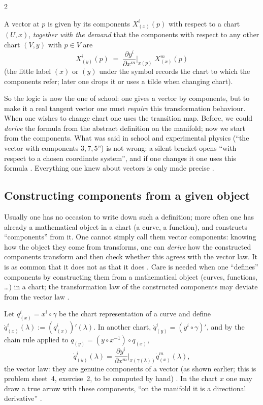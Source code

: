 \begin{paracol}{2}
\begin{definition}\label{def:tf-vector}
A vector at $p$ is given by its components $X^i_{(x)}(p)$ with respect to a chart $(U,x)$, \emph{together with the demand}
that the components with respect to any other chart $(V,y)$ with $p\in V$ are
\[
  X^i_{(y)}(p)\;=\;\frac{\partial y^i}{\partial x^m}\Big|_{x(p)}\;X^m_{(x)}(p)
\]
(the little label $(x)$ or $(y)$ under the symbol records the chart to which the components refer; later one drops it or uses
a tilde when changing chart).
\end{definition}
So the logic is now the one of school: one gives a vector by components, but to make it a real tangent vector one must
\emph{require} this transformation behaviour. When one wishes to change chart one uses the transition map. Before, we
could \emph{derive} the formula from the abstract definition on the manifold; now we start from the components. What was said in
school and experimental physics (``the vector with components $3,7,5$'') is not wrong: a silent bracket opens ``with
respect to a chosen coordinate system'', and if one changes it one uses this formula .
Everything one knew about vectors is only made precise .

\subsection{Constructing components from a given object}\label{ssec:tf-construct}

Usually one has no occasion to write down such a definition; more often one has already a mathematical object in a chart
(a curve, a function), and constructs ``components'' from it. One cannot simply call them vector components: knowing how the
object they come from transforms, one can \emph{derive} how the constructed components transform and then check whether this
agrees with the vector law. It is as common that it does not as that it does .
Care is needed when one ``defines'' components by constructing them from a mathematical object (curves, functions, \dots) in a chart;
the transformation law of the constructed components may deviate from the vector law .

\begin{example}\label{ex:tf-first}
Let $q^i_{(x)}=x^i\circ\gamma$ be the chart representation of a curve and define $\dot q^i_{(x)}(\lambda):=(q^i_{(x)})'(\lambda)$.
In another chart, $\dot q^i_{(y)}=(y^i\circ\gamma)'$, and by the chain rule applied to $q_{(y)}=(y\circ x^{-1})\circ q_{(x)}$,
\[
  \dot q^i_{(y)}(\lambda)=\frac{\partial y^i}{\partial x^m}\Big|_{x(\gamma(\lambda))}\dot q^m_{(x)}(\lambda),
\]
the vector law: they are genuine components of a vector (as shown earlier; this is problem sheet~4, exercise~2, to be computed
by hand) .
In the chart $x$ one may draw a true arrow with these components, ``on the manifold it is a directional derivative''
.
\end{example}


\end{paracol}
